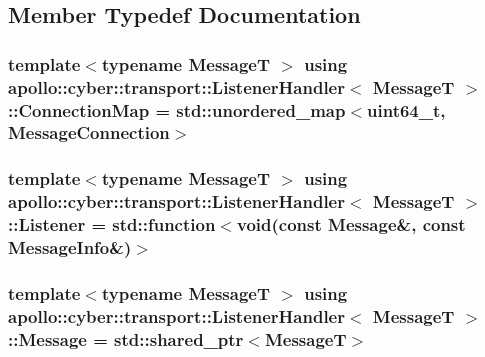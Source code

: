 \subsection{Member Typedef Documentation}
\hypertarget{classapollo_1_1cyber_1_1transport_1_1ListenerHandler_a5a6f5bc05280412183b1d0f65ce5e683}{
\subsubsection[{Connection\-Map}]{\setlength{\rightskip}{0pt plus 5cm}template$<$typename Message\-T $>$ using {\bf apollo\-::cyber\-::transport\-::\-Listener\-Handler}$<$ Message\-T $>$\-::{\bf Connection\-Map} =  std\-::unordered\-\_\-map$<$uint64\-\_\-t, {\bf Message\-Connection}$>$}}\label{classapollo_1_1cyber_1_1transport_1_1ListenerHandler_a5a6f5bc05280412183b1d0f65ce5e683}
\hypertarget{classapollo_1_1cyber_1_1transport_1_1ListenerHandler_a96764e623a89ce8a872d2e43b6408d98}{
\subsubsection[{Listener}]{\setlength{\rightskip}{0pt plus 5cm}template$<$typename Message\-T $>$ using {\bf apollo\-::cyber\-::transport\-::\-Listener\-Handler}$<$ Message\-T $>$\-::{\bf Listener} =  std\-::function$<$void(const {\bf Message}\&, const {\bf Message\-Info}\&)$>$}}\label{classapollo_1_1cyber_1_1transport_1_1ListenerHandler_a96764e623a89ce8a872d2e43b6408d98}
\hypertarget{classapollo_1_1cyber_1_1transport_1_1ListenerHandler_a52a658e4523db4704b6d7e97f326d774}{
\subsubsection[{Message}]{\setlength{\rightskip}{0pt plus 5cm}template$<$typename Message\-T $>$ using {\bf apollo\-::cyber\-::transport\-::\-Listener\-Handler}$<$ Message\-T $>$\-::{\bf Message} =  std\-::shared\-\_\-ptr$<$Message\-T$>$}}\label{classapollo_1_1cyber_1_1transport_1_1ListenerHandler_a52a658e4523db4704b6d7e97f326d774}
